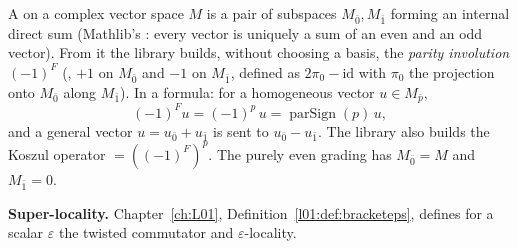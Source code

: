 A  on a complex vector space $M$ is a pair of subspaces $M_{\bar0},M_{\bar1}$
forming an internal direct sum (Mathlib's : every vector is uniquely a
sum of an even and an odd vector). From it the library builds, without choosing a basis, the
\emph{parity involution} $(-1)^F$ (, $+1$ on $M_{\bar0}$ and $-1$ on $M_{\bar1}$,
defined as $2\pi_0-\mathrm{id}$ with $\pi_0$ the projection onto $M_{\bar0}$ along $M_{\bar1}$). In a
formula: for a homogeneous vector $u\in M_{\bar p}$,
\begin{equation*}
(-1)^F u=(-1)^{p}\,u=\operatorname{parSign}(p)\,u ,
\end{equation*}
and a general vector $u=u_{\bar0}+u_{\bar1}$ is sent to $u_{\bar0}-u_{\bar1}$. The library also builds
the Koszul operator  $=((-1)^F)^p$. The purely even grading
 has $M_{\bar0}=M$ and $M_{\bar1}=0$.

\textbf{Super-locality.} Chapter~\ref{ch:L01}, Definition~\ref{l01:def:bracketeps}, defines for a
scalar $\varepsilon$ the twisted commutator and $\varepsilon$-locality.

